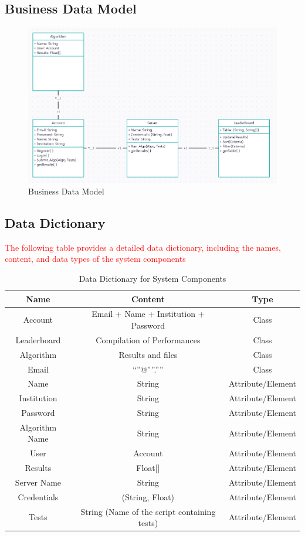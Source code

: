 \documentclass[12pt]{article}
\begin{document}
\subsection{Business Data Model}
\begin{figure}[H]
    \centering
    \includegraphics[width=1\linewidth]{diagrams/Class.png}
    \caption{Business Data Model}
\end{figure}
\subsection{Data Dictionary}
\textcolor{red}{The following table provides a detailed data dictionary, including the names, content, and data types of the system components}
\begin{table}[H]
    \centering
    \begin{tabular}{|c|c|c|}
         \hline \textbf{Name} & \textbf{Content} & \textbf{Type} \\
         \hline Account & Email + Name + Institution + Password & Class \\
         \hline Leaderboard & Compilation of Performances & Class \\
         \hline Algorithm & Results and files & Class \\
         \hline Email & “”@””.”” & Class \\
         \hline Name & String & Attribute/Element \\
         \hline Institution & String & Attribute/Element \\
         \hline Password & String & Attribute/Element \\
         \hline Algorithm Name & String & Attribute/Element \\
         \hline User & Account & Attribute/Element \\
         \hline Results & Float[] & Attribute/Element \\
         \hline Server Name & String & Attribute/Element \\
         \hline Credentials & (String, Float) & Attribute/Element \\
         \hline Tests & String (Name of the script containing tests) & Attribute/Element \\
         \hline
    \end{tabular}
    \caption{Data Dictionary for System Components}
\end{table}
\end{document}
